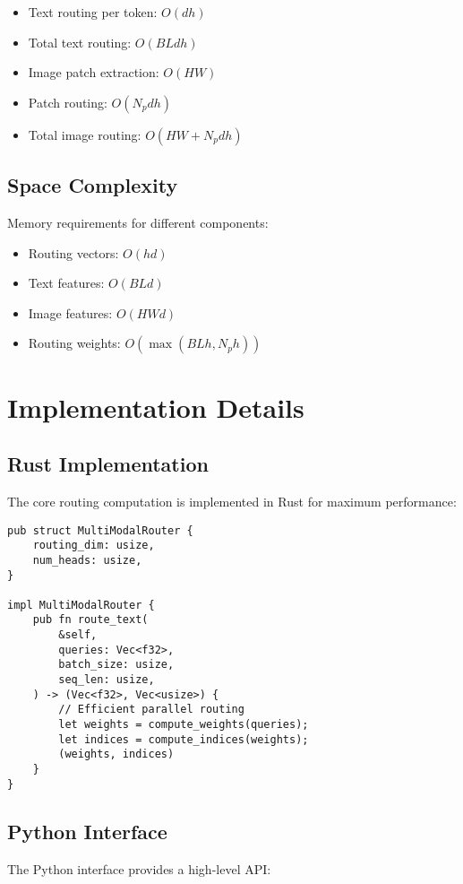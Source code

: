 \documentclass[10pt]{article}
\begin{document}
\begin{itemize}
    \item Text routing per token: $O(dh)$
    \item Total text routing: $O(BLdh)$
    \item Image patch extraction: $O(HW)$
    \item Patch routing: $O(N_pdh)$
    \item Total image routing: $O(HW + N_pdh)$
\end{itemize}

\subsection{Space Complexity}
Memory requirements for different components:

\begin{itemize}
    \item Routing vectors: $O(hd)$
    \item Text features: $O(BLd)$
    \item Image features: $O(HWd)$
    \item Routing weights: $O(\max(BLh, N_ph))$
\end{itemize}

\section{Implementation Details}

\subsection{Rust Implementation}
The core routing computation is implemented in Rust for maximum performance:

\begin{verbatim}
pub struct MultiModalRouter {
    routing_dim: usize,
    num_heads: usize,
}

impl MultiModalRouter {
    pub fn route_text(
        &self,
        queries: Vec<f32>,
        batch_size: usize,
        seq_len: usize,
    ) -> (Vec<f32>, Vec<usize>) {
        // Efficient parallel routing
        let weights = compute_weights(queries);
        let indices = compute_indices(weights);
        (weights, indices)
    }
}
\end{verbatim}

\subsection{Python Interface}
The Python interface provides a high-level API:
\end{document}
